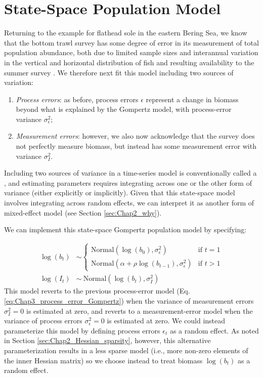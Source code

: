 \section{State-Space Population Model}\label{sec:Chap3_state_space}

Returning to the example for flathead sole in the eastern Bering Sea, we know that the bottom trawl survey has some degree of error in its measurement of total population abundance, both due to limited sample sizes and interannual variation in the vertical and horizontal distribution of fish and resulting availability to the summer survey \cite{oleary_understanding_2022}.  We therefore next fit this model including two sources of variation:
\begin{enumerate}
    \item \textit{Process errors}:  as before, process errors \(\epsilon\) represent a change in biomass beyond what is explained by the Gompertz model, with process-error variance \(\sigma_{\epsilon}^2\); 
    
    \item \textit{Measurement errors}:  however, we also now acknowledge that the survey does not perfectly measure biomass, but instead has some measurement error with variance \(\sigma_I^2\).
\end{enumerate}
Including two sources of variance in a time-series model is conventionally called a , and estimating parameters requires integrating across one or the other form of variance (either explicitly or implicitly).  Given that this state-space model involves integrating across random effects, we can interpret it as another form of mixed-effect model (see Section \ref{sec:Chap2_why}).   

We can implement this state-space Gompertz population model by specifying:

\begin{equation} \label{eq:Chap3_state_space_Gopmertz}
\begin{aligned}
    \log(b_{t}) & \sim 
    \begin{cases}
        \mathrm{Normal} ( \log(b_0), \sigma_{\epsilon}^2) & \text{if } t=1 \\ 
        \mathrm{Normal} ( \alpha + \rho \log(b_{t-1}), \sigma_{\epsilon}^2) & \text{if } t>1 
    \end{cases} \\
    \log(I_t) & \sim\ \mathrm{Normal} (\log(b_{t}), \sigma_{I}^2)
\end{aligned}
\end{equation}
This model reverts to the previous process-error model (Eq. \ref{eq:Chap3_process_error_Gompertz}) when the variance of measurement errors \(\sigma_I^2 = 0\) is estimated at zero, and reverts to a measurement-error model when the variance of process errors \(\sigma_{\epsilon}^2 = 0\) is estimated at zero.  We could instead parameterize this model by defining process errors \(\epsilon_t\) as a random effect.  As noted in Section \ref{sec:Chap2_Hessian_sparsity}, however, this alternative parameterization results in a less sparse model (i.e., more non-zero elements of the inner Hessian matrix) so we choose instead to treat biomass \(\log(b_t)\) as a random effect.  

